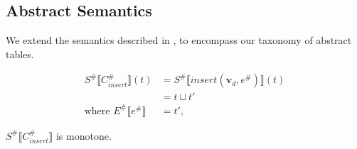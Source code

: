 \subsection{Abstract Semantics}

We extend the semantics described in \cite{halder_abstract_2012}, to encompass our taxonomy of abstract tables.

\begin{align*}
    S^\# \llbracket C_{insert}^\# \rrbracket (t) &= S^\# \llbracket insert(\mathbf{v}_d, e^\#) \rrbracket (t) \\
    &= t \sqcup t' \\
    \text{where } E^\# \llbracket e^\# \rrbracket &= t',
\end{align*}

\begin{lemma}
    $S^\# \llbracket C_{insert}^\# \rrbracket$ is monotone.
\end{lemma}
